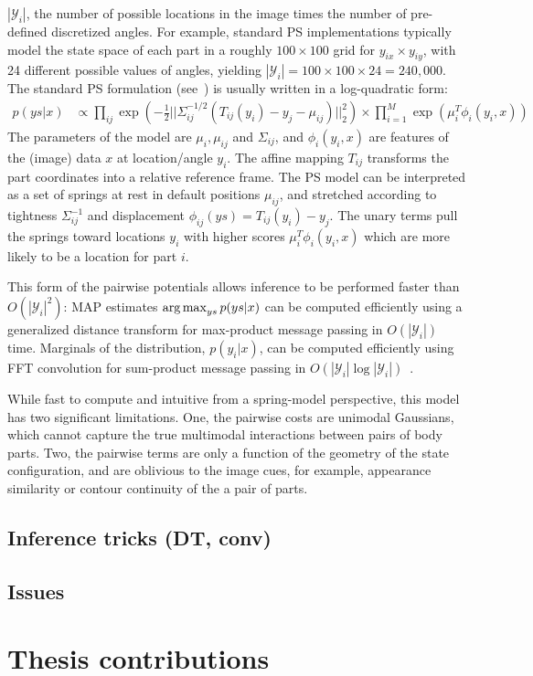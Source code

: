 $|\mathcal{Y}_i|$, the number of possible locations in the image times the 
number of pre-defined discretized angles. For example, standard PS 
implementations typically model the state space of each part in a roughly $100 
\times 100$ grid for $y_{ix} \times y_{iy}$, with 24 different possible values 
of angles, yielding $|\mathcal{Y}_i| = 100 \times 100 \times 24 = 240,000$. The 
standard PS formulation (see~\cite{felz05}) is usually written in a 
log-quadratic form:
\begin{align}
p( ys | x) &\propto \prod_{ij} \exp(-\frac{1}{2}||\Sigma_{ij}^{-1/2}(T_{ij}(y_i) - y_j - \mu_{ij})||_2^2)  \times \prod_{i=1}^M \exp(\mu_i^T\phi_i(y_i,x))
\label{eqn:standard_ps}
\end{align}
The parameters of the model are $\mu_i,\mu_{ij}$ and $\Sigma_{ij}$, and $\phi_i(y_i,x)$ are features of the (image) data $x$ at location/angle $y_i$.  The affine mapping $T_{ij}$ transforms the part coordinates into a relative reference frame.  The PS model can be interpreted as a set of springs at rest in default positions $\mu_{ij}$, and stretched according to tightness $\Sigma^{-1}_{ij}$ and displacement $\phi_{ij}(ys) = T_{ij}(y_i) - y_j$.  The unary terms pull the springs toward locations $y_i$ with higher scores $\mu_i^T\phi_i(y_i,x)$ which are more likely to be a location for part $i$.

This form of the pairwise potentials allows inference to be performed faster than $O(|\mathcal{Y}_i|^2)$:  MAP estimates $\mathop{\arg\max}_{ys} p(ys | x)$ can be computed efficiently using a generalized distance transform for max-product message passing in $O(|\mathcal{Y}_i|)$ time.  Marginals of the distribution, $p(y_i | x)$, can be computed efficiently using FFT convolution for sum-product message passing in $O(|\mathcal{Y}_i| \log |\mathcal{Y}_i|)$~\cite{felz05}.

While fast to compute and intuitive from a spring-model perspective, this model has two significant limitations.  One, the pairwise costs are unimodal Gaussians, which cannot capture the true multimodal interactions between pairs of body parts.  Two, the pairwise terms are only a function of the geometry of the state configuration, and are oblivious to the image cues, for example, appearance similarity or contour continuity of the a pair of parts.

\section{Inference tricks (DT, conv)}
\section{Issues}

\chapter{Thesis contributions}
